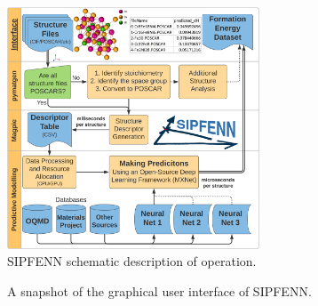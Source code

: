 \begin{figure}[H]
    \centering
    \includegraphics[width=0.67\textwidth]{sipfenn/SIPFENN_GraphicalAbstract_noPerformance.png}
    \caption{SIPFENN schematic description of operation.}
    \label{sipfenn:fig:sipfenn}
\end{figure}

\begin{figure}[H]
    \centering
    \caption{A snapshot of the graphical user interface of SIPFENN.}
    \label{sipfenn:fig:sipfennGUI}
\end{figure}

